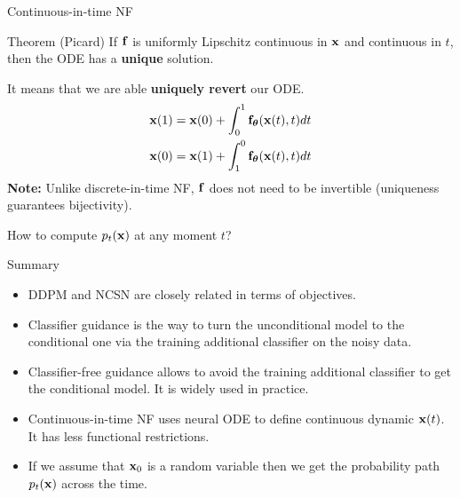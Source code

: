 \begin{frame}{Continuous-in-time NF}
	\begin{block}{Theorem (Picard)}
		If $\mathbf{f}$ is uniformly Lipschitz continuous in $\mathbf{x}$ and continuous in $t$, then the ODE has a \textbf{unique} solution.
	\end{block}
	It means that we are able \textbf{uniquely revert} our ODE. 
	\begin{align*}
		\mathbf{x}(1) &= \mathbf{x}(0) + \int_{0}^{1} \mathbf{f}_{\boldsymbol{\theta}}(\mathbf{x}(t), t) dt \\
		\mathbf{x}(0) &= \mathbf{x}(1) + \int_{1}^{0} \mathbf{f}_{\boldsymbol{\theta}}(\mathbf{x}(t), t) dt
	\end{align*}
	\textbf{Note:} Unlike discrete-in-time NF, $\mathbf{f}$ does not need to be invertible (uniqueness guarantees bijectivity).
	
	How to compute $p_t(\mathbf{x})$ at any moment $t$?
\end{frame}
\begin{frame}{Summary}
	\begin{itemize}
		\item DDPM and NCSN are closely related in terms of objectives.	
		\vfill
		\item Classifier guidance is the way to turn the unconditional model to the conditional one via the training additional classifier on the noisy data.
		\vfill
		\item Classifier-free guidance allows to avoid the training additional classifier to get the conditional model. It is widely used in practice.
		\vfill 
		\item Continuous-in-time NF uses neural ODE to define continuous dynamic $\mathbf{x}(t)$. It has less functional restrictions.
		\vfill
		\item If we assume that $\mathbf{x}_0$ is a random variable then we get the probability path $p_t(\mathbf{x})$ across the time.
	\end{itemize}
\end{frame}
 